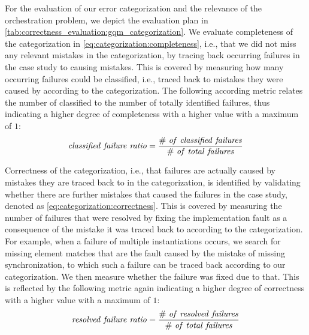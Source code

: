 For the evaluation of our error categorization and the relevance of the orchestration problem, we depict the evaluation plan in \autoref{tab:correctness_evaluation:gqm_categorization}.
We evaluate completeness of the categorization in \autoref{eq:categorization:completeness}, i.e., that we did not miss any relevant mistakes in the categorization, by tracing back occurring failures in the case study to causing mistakes. 
This is covered by measuring how many occurring failures could be classified, i.e., traced back to mistakes they were caused by according to the categorization.
The following according metric relates the number of classified to the number of totally identified failures, thus indicating a higher degree of completeness with a higher value with a maximum of $1$:
\begin{align*}
    \mathvariable{classified\ failure\ ratio} = \frac{\mathvariable{\#\ of\ classified\ failures}}{\mathvariable{\#\ of\ total\ failures}}
\end{align*}

Correctness of the categorization, i.e., that failures are actually caused by mistakes they are traced back to in the categorization, is identified by validating whether there are further mistakes that caused the failures in the case study, denoted as \autoref{eq:categorization:correctness}.
This is covered by measuring the number of failures that were resolved by fixing the implementation fault as a consequence of the mistake it was traced back to according to the categorization.
For example, when a failure of multiple instantiations occurs, we search for missing element matches that are the fault caused by the mistake of missing synchronization, to which such a failure can be traced back according to our categorization.
We then measure whether the failure was fixed due to that.
This is reflected by the following metric again indicating a higher degree of correctness with a higher value with a maximum of $1$:
\begin{align*}
    \mathvariable{resolved\ failure\ ratio} = \frac{\mathvariable{\#\ of\ resolved\ failures}}{\mathvariable{\#\ of\ total\ failures}}
\end{align*}

